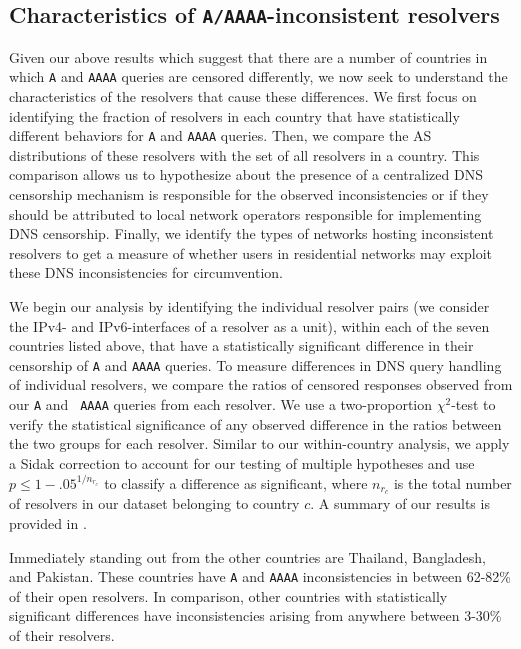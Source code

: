 \subsection{Characteristics of {\tt A/AAAA}-inconsistent resolvers}
\label{sec:resources:resolvers}
Given our above results which suggest that there are a number of countries in
which {\tt A} and {\tt AAAA} queries are censored differently, we now seek to
understand the characteristics of the resolvers that cause these differences.
%
We first focus on identifying the fraction of resolvers in each country that
have statistically different behaviors for {\tt A} and {\tt AAAA} queries.
Then, we compare the AS distributions of these resolvers with the set of all
resolvers in a country. This comparison allows us to hypothesize about the
presence of a centralized DNS censorship mechanism is responsible for the
observed inconsistencies or if they should be attributed to local network
operators responsible for implementing DNS censorship. Finally, we identify the
types of networks hosting inconsistent resolvers to get a measure of whether
users in residential networks may exploit these DNS inconsistencies for
circumvention.

%
We begin our analysis by identifying the individual resolver pairs (\ie we
consider the IPv4- and IPv6-interfaces of a resolver as a unit), within each
of the seven countries listed above, that have a statistically significant
difference in their censorship of {\tt A} and {\tt AAAA} queries.
%
To measure differences in DNS query handling of individual resolvers, we
compare the ratios of censored responses observed from our {\tt A} and {\tt
AAAA} queries {from each resolver}.  
%
We use a two-proportion $\chi^2$-test to verify the statistical significance of any
observed difference in the ratios between the two groups for each resolver.
Similar to our within-country analysis, we apply a Sidak correction to account
for our testing of multiple hypotheses and use $p \leq 1-{.05}^{1/n_{r_c}}$ to
classify a difference as significant, where $n_{r_c}$ is the total number of
resolvers in our dataset belonging to country $c$.
%
A summary of our results is provided in . 

%
Immediately standing out from the other countries are Thailand, Bangladesh, and
Pakistan. These countries have {\tt A} and {\tt AAAA} inconsistencies in
between 62-82\% of their open resolvers. In comparison, other countries with
statistically significant differences have inconsistencies arising from
anywhere between 3-30\% of their resolvers. 
%

